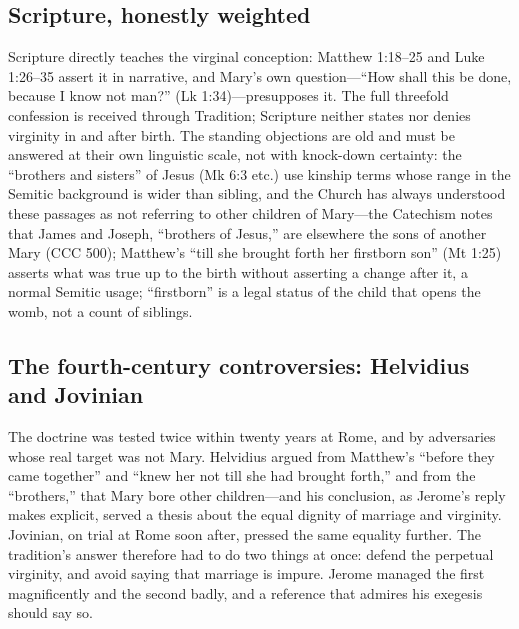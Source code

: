 \subsection*{Scripture, honestly weighted}

Scripture directly teaches the virginal conception: Matthew 1:18--25 and
Luke 1:26--35 assert it in narrative, and Mary's own question---``How
shall this be done, because I know not man?'' (Lk 1:34)---presupposes
it. The full threefold confession is received through
Tradition; Scripture neither states nor denies virginity in and after
birth. The standing objections are old and must be answered at their own
linguistic scale, not with knock-down certainty: the ``brothers and
sisters'' of Jesus (Mk 6:3 etc.) use kinship terms whose range in the
Semitic background is wider than sibling, and the Church has always
understood these passages as not referring to other children of
Mary---the Catechism notes that James and Joseph, ``brothers of Jesus,''
are elsewhere the sons of another Mary (CCC 500); Matthew's ``till she
brought forth her firstborn son'' (Mt 1:25) asserts what was true up to
the birth without asserting a change after it, a normal Semitic usage;
``firstborn'' is a legal status of the child that opens the womb, not a
count of siblings.

\subsection*{The fourth-century controversies: Helvidius and Jovinian}

The doctrine was tested twice within twenty years at Rome, and by
adversaries whose real target was not Mary. Helvidius argued from
Matthew's ``before they came together'' and ``knew her not till she had
brought forth,'' and from the ``brothers,'' that Mary bore other
children---and his conclusion, as Jerome's reply makes explicit, served a
thesis about the equal dignity of marriage and virginity. Jovinian, on
trial at Rome soon after, pressed the same equality further. The
tradition's answer therefore had to do two things at once: defend the
perpetual virginity, and avoid saying that marriage is impure. Jerome
managed the first magnificently and the second badly, and a reference
that admires his exegesis should say so.

